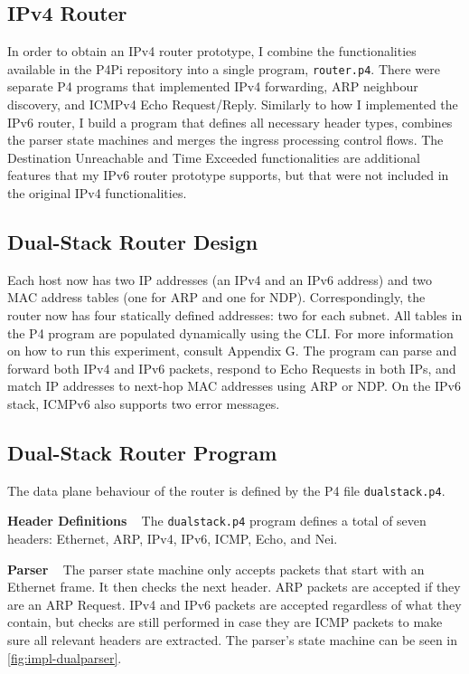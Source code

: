\subsection{IPv4 Router}
\label{sec:3.9.1}

In order to obtain an IPv4 router prototype, I combine the functionalities available in the P4Pi repository into a single program, \texttt{router.p4}. There were separate P4 programs that implemented IPv4 forwarding, ARP neighbour discovery, and ICMPv4 Echo Request/Reply. Similarly to how I implemented the IPv6 router, I build a program that defines all necessary header types, combines the parser state machines and merges the ingress processing control flows. The Destination Unreachable and Time Exceeded functionalities are additional features that my IPv6 router prototype supports, but that were not included in the original IPv4 functionalities.



\subsection{Dual-Stack Router Design}
\label{sec:3.9.2}

Each host now has two IP addresses (an IPv4 and an IPv6 address) and two MAC address tables (one for ARP and one for NDP). Correspondingly, the router now has four statically defined addresses: two for each subnet. All tables in the P4 program are populated dynamically using the CLI. For more information on how to run this experiment, consult Appendix G. The program can parse and forward both IPv4 and IPv6 packets, respond to Echo Requests in both IPs, and match IP addresses to next-hop MAC addresses using ARP or NDP. On the IPv6 stack, ICMPv6 also supports two error messages.



\subsection{Dual-Stack Router Program}
\label{sec:3.9.3}

The data plane behaviour of the router is defined by the P4 file \texttt{dualstack.p4}.

\textbf{Header Definitions} ~ The \texttt{dualstack.p4} program defines a total of seven headers: Ethernet, ARP, IPv4, IPv6, ICMP, Echo, and Nei. 

\textbf{Parser} ~ The parser state machine only accepts packets that start with an Ethernet frame. It then checks the next header. ARP packets are accepted if they are an ARP Request. IPv4 and IPv6 packets are accepted regardless of what they contain, but checks are still performed in case they are ICMP packets to make sure all relevant headers are extracted. The parser’s state machine can be seen in \cref{fig:impl-dualparser}.

